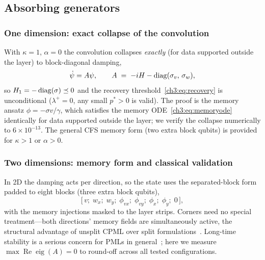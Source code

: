 \subsection{Absorbing generators}
\label{ch3:sec:generators}

\subsubsection{One dimension: exact collapse of the convolution}
\label{ch3:sec:1d}

With $\kappa=1$, $\alpha=0$ the convolution collapses \emph{exactly} (for
data supported outside the layer) to block-diagonal damping,
\begin{equation}
  \dot\psi = A\psi, \qquad
  A \;=\; -iH - \diag(\sigma_v,\, \sigma_w),
  \label{ch3:eq:1dcollapse}
\end{equation}
so $H_1 = -\operatorname{diag}(\sigma)\preceq 0$ and the recovery
threshold~\eqref{ch3:eq:recovery} is unconditional ($\lambda^{+}=0$, any small
$p^{*}>0$ is valid).  The proof is the memory ansatz
$\phi = -\sigma v/\gamma$, which satisfies the memory
ODE~\eqref{ch3:eq:memoryode} identically for data supported outside the
layer; we verify the collapse numerically to $6\times10^{-13}$.  The
general CFS memory form (two extra block qubits) is provided for
$\kappa>1$ or $\alpha>0$.

\subsubsection{Two dimensions: memory form and classical validation}
\label{ch3:sec:2d}

In 2D the damping acts per direction, so the state uses the
separated-block form padded to eight blocks (three extra block qubits),
\begin{equation}
  \bigl[\,v;\; w_x;\; w_y;\; \phi_{vx};\; \phi_{vy};\;
        \phi_{x};\; \phi_{y};\; 0\,\bigr],
  \label{ch3:eq:blocks}
\end{equation}
with the memory injections masked to the layer strips.  Corners need no
special treatment---both directions' memory fields are simultaneously
active, the structural advantage of unsplit CPML over split
formulations~\cite{roden2000cpml}.  Long-time stability is a serious
concern for PMLs in
general~\cite{becache2003stability,becache2004longtime,duru2022pmlreview};
here we measure $\max\operatorname{Re}\operatorname{eig}(A) = 0$ to
round-off across all tested configurations.

